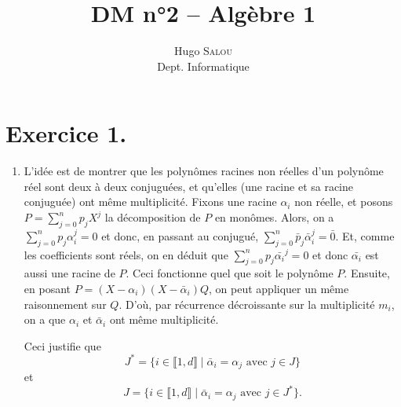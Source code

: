 \documentclass{../../td}
\title{DM n°2 -- Algèbre 1}
\author{Hugo {\scshape Salou}\\ Dept. Informatique}
\begin{document}
  \maketitle

  \chapter*{Exercice 1.}

  \begin{enumerate}
    \item L'idée est de montrer que les polynômes racines non réelles d'un polynôme réel sont deux à deux conjuguées, et qu'elles (une racine et sa racine conjuguée) ont même multiplicité.
      Fixons une racine $\alpha_i$ non réelle, et posons $P = \sum_{j = 0}^n p_j X^j$ la décomposition de $P$ en monômes.
      Alors, on a $\sum_{j = 0}^n p_j \alpha_i^j = 0$ et donc, en passant au conjugué, $\sum_{j = 0}^n \bar{p}_j \bar{\alpha}_i^j = \bar{0}$.
      Et, comme les coefficients sont réels, on en déduit que $\sum_{j=0}^n p_j \bar{\alpha_i}^j = 0$ et donc $\bar{\alpha_i}$ est aussi une racine de $P$.
      Ceci fonctionne quel que soit le polynôme $P$.
      Ensuite, en posant $P = (X - \alpha_i) (X - \bar{\alpha}_i) Q$, on peut appliquer un même raisonnement sur $Q$.
      D'où, par récurrence décroissante sur la multiplicité $m_i$, on a que $\alpha_i$ et $\bar{\alpha}_i$ ont même multiplicité.

      Ceci justifie que 
      \[
        J^* = \{i \in \llbracket 1, d \rrbracket  \mid  \bar{\alpha}_i = \alpha_j \text{ avec } j \in J \}
      \]et\[
        J = \{i \in \llbracket 1, d \rrbracket  \mid  \bar{\alpha}_i = \alpha_j \text{ avec } j \in J^* \}
      .\]


\end{enumerate}
\end{document}
